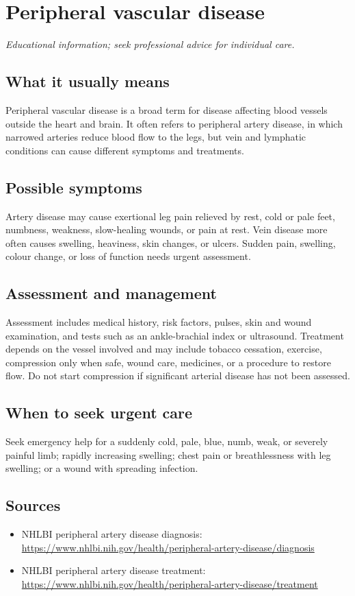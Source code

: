 \chapter{Peripheral vascular disease}

\medskip
\noindent\textit{Educational information; seek professional advice for individual care.}

\section*{What it usually means}
Peripheral vascular disease is a broad term for disease affecting blood vessels outside the heart and brain. It often refers to peripheral artery disease, in which narrowed arteries reduce blood flow to the legs, but vein and lymphatic conditions can cause different symptoms and treatments.

\section*{Possible symptoms}
Artery disease may cause exertional leg pain relieved by rest, cold or pale feet, numbness, weakness, slow-healing wounds, or pain at rest. Vein disease more often causes swelling, heaviness, skin changes, or ulcers. Sudden pain, swelling, colour change, or loss of function needs urgent assessment.

\section*{Assessment and management}
Assessment includes medical history, risk factors, pulses, skin and wound examination, and tests such as an ankle-brachial index or ultrasound. Treatment depends on the vessel involved and may include tobacco cessation, exercise, compression only when safe, wound care, medicines, or a procedure to restore flow. Do not start compression if significant arterial disease has not been assessed.

\section*{When to seek urgent care}
Seek emergency help for a suddenly cold, pale, blue, numb, weak, or severely painful limb; rapidly increasing swelling; chest pain or breathlessness with leg swelling; or a wound with spreading infection.

\section*{Sources}
\begin{itemize}
\item NHLBI peripheral artery disease diagnosis: \url{https://www.nhlbi.nih.gov/health/peripheral-artery-disease/diagnosis}
\item NHLBI peripheral artery disease treatment: \url{https://www.nhlbi.nih.gov/health/peripheral-artery-disease/treatment}
\end{itemize}
